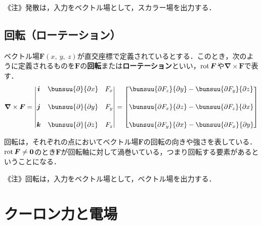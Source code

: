 《注》発散は，入力をベクトル場として，スカラー場を出力する．



\subsection{回転（ローテーション）}

ベクトル場$\bm{F}(x,\ y,\ z)$が直交座標で定義されているとする．このとき，次のように定義されるものを$\bm{F}$の\textbf{回転}または\textbf{ローテーション}といい，$\operatorname{rot} \bm{F}$や$\bm{\nabla} \times \bm{F}$で表す．
\begin{equation}
	\bm{\nabla} \times \bm{F} =
	\begin{vmatrix}
		\bm{i} & \bunsuu{\partial}{\partial x} & F_x\\[5mm]
		\bm{j} & \bunsuu{\partial}{\partial y} & F_y\\[5mm]
		\bm{k} & \bunsuu{\partial}{\partial z} & F_z\\
	\end{vmatrix}
	=
	\begin{bmatrix}
		\bunsuu{\partial F_z}{\partial y} -
		\bunsuu{\partial F_y}{\partial z}\\[5mm]
		\bunsuu{\partial F_x}{\partial z} -
		\bunsuu{\partial F_z}{\partial x}\\[5mm]
		\bunsuu{\partial F_y}{\partial x} -
		\bunsuu{\partial F_x}{\partial y}
	\end{bmatrix}
\end{equation}

回転は，それぞれの点においてベクトル場$\bm{F}$の回転の向きや強さを表している．$\operatorname{rot} \bm{F} \ne \bm{0}$のとき$\bm{F}$が回転軸に対して渦巻いている，つまり回転する要素があるということになる．

《注》回転は，入力をベクトル場として，ベクトル場を出力する．


\section{クーロン力と電場}


